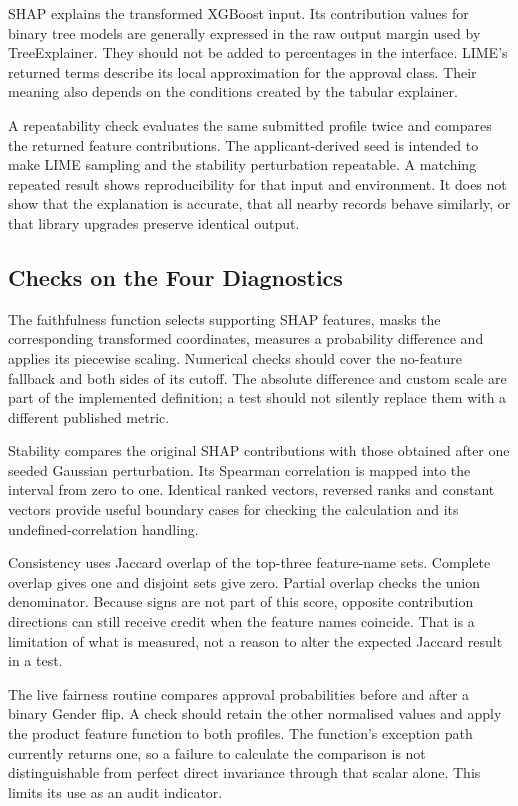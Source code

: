 SHAP explains the transformed XGBoost input. Its contribution values for binary tree models are generally expressed in the raw output margin used by TreeExplainer. They should not be added to percentages in the interface. LIME's returned terms describe its local approximation for the approval class. Their meaning also depends on the conditions created by the tabular explainer.

A repeatability check evaluates the same submitted profile twice and compares the returned feature contributions. The applicant-derived seed is intended to make LIME sampling and the stability perturbation repeatable. A matching repeated result shows reproducibility for that input and environment. It does not show that the explanation is accurate, that all nearby records behave similarly, or that library upgrades preserve identical output.

\subsection{Checks on the Four Diagnostics}
The faithfulness function selects supporting SHAP features, masks the corresponding transformed coordinates, measures a probability difference and applies its piecewise scaling. Numerical checks should cover the no-feature fallback and both sides of its cutoff. The absolute difference and custom scale are part of the implemented definition; a test should not silently replace them with a different published metric.

Stability compares the original SHAP contributions with those obtained after one seeded Gaussian perturbation. Its Spearman correlation is mapped into the interval from zero to one. Identical ranked vectors, reversed ranks and constant vectors provide useful boundary cases for checking the calculation and its undefined-correlation handling.

Consistency uses Jaccard overlap of the top-three feature-name sets. Complete overlap gives one and disjoint sets give zero. Partial overlap checks the union denominator. Because signs are not part of this score, opposite contribution directions can still receive credit when the feature names coincide. That is a limitation of what is measured, not a reason to alter the expected Jaccard result in a test.

The live fairness routine compares approval probabilities before and after a binary Gender flip. A check should retain the other normalised values and apply the product feature function to both profiles. The function's exception path currently returns one, so a failure to calculate the comparison is not distinguishable from perfect direct invariance through that scalar alone. This limits its use as an audit indicator.

